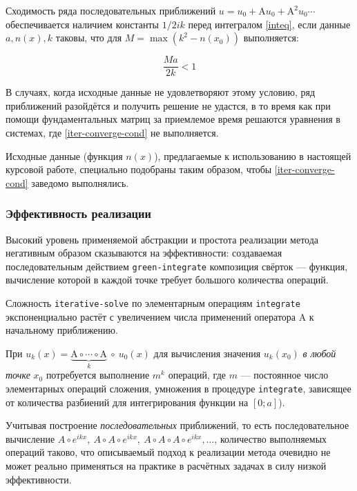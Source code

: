 \documentclass{article}
\newcommand{\procname}[1]{\texttt{#1}}
\providecommand{\op}[1]{\mathrm{#1}}
\providecommand{\comp}{\circ}
\numberwithin{equation}{section}
\begin{document}
Сходимость ряда последовательных приближений $u = u_0 + \op{A} u_0 +
\op{A}^2 u_0 \dotsb$ обеспечивается наличием константы $1/2ik$
перед интегралом \eqref{inteq}, если данные $a, n(x), k$ таковы, что
для $M=\max(k^2-n(x_0))$ выполняется:

\begin{equation}\label{iter-converge-cond}
  \frac{Ma}{2k}<1
\end{equation}

В случаях, когда исходные данные не удовлетворяют этому условию, ряд
приближений разойдётся и получить решение не удастся, в то время как
при помощи фундаментальных матриц за приемлемое время решаются
уравнения в системах, где \eqref{iter-converge-cond} не выполняется.

Исходные данные (функция $n(x)$), предлагаемые к использованию в
настоящей курсовой работе, специально подобраны таким образом, чтобы
\eqref{iter-converge-cond} заведомо выполнялись.

\subsubsection{Эффективность реализации}

Высокий уровень применяемой абстракции и простота реализации метода
негативным образом сказываются на эффективности: создаваемая
последовательным действием \procname{green-integrate} композиция
свёрток — функция, вычисление которой в каждой точке требует большого
количества операций.

Сложность \procname{iterative-solve} по элементарным операциям
\procname{integrate} экспоненциально растёт с увеличением числа
применений оператора $\op{A}$ к начальному приближению.

При $u_k(x) = \underbrace{\op{A} \comp \dotsb \comp \op{A}}_k\ \comp\ u_0(x)$ для
вычисления значения $u_k(x_0)$ \emph{в любой точке} $x_0$ потребуется
выполнение $m^k$ операций, где $m$ — постоянное число элементарных
операций сложения, умножения в процедуре \procname{integrate},
зависящее от количества разбиений для интегрирования функции на $[0;
a]$).

Учитывая построение \emph{последовательных} приближений, то есть
последовательное вычисление $A \comp e^{ikx},\ A \comp A \comp
e^{ikx},\ A \comp A \comp A \comp e^{ikx},\dotsc$, количество
выполняемых операций таково, что описываемый подход к реализации
метода очевидно не может реально применяться на практике в расчётных
задачах в силу низкой эффективности.
\end{document}
